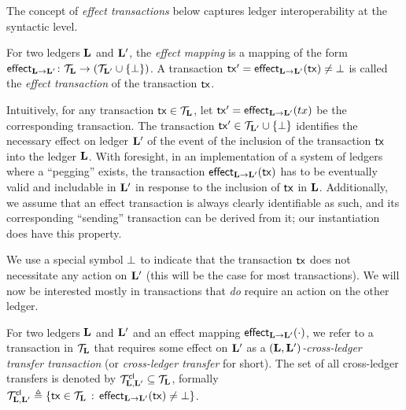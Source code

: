 The concept of {\em effect transactions} below captures ledger interoperability
at the syntactic level.

\begin{definition}
\label{def:effect}
For two ledgers $\mathbf{L}$ and $\mathbf{L}'$, the \emph{effect mapping} is a
mapping of the form
$
  \mathsf{effect}_{\mathbf{L}\rightarrow \mathbf{L}'}
\colon
\mathcal{T}_{\mathbf{L}}
\to
\left(
  \mathcal{T}_{\mathbf{L}'}
  \cup
  \{\bot\}
\right)
$.
  A transaction $ \mathsf{tx}'=\mathsf{effect}_{\mathbf{L}\rightarrow \mathbf{L}'}(\mathsf{tx}) \neq \bot$ is called the \emph{effect
transaction} of the transaction $\mathsf{tx}$.
\end{definition}

Intuitively, for any transaction $\mathsf{tx}\in\mathcal{T}_{\mathbf{L}}$, let $\mathsf{tx}' = \mathsf{effect}_{\mathbf{L}\rightarrow \mathbf{L}'}(tx)$ be the corresponding transaction. The transaction $\mathsf{tx}' \in \mathcal{T}_{\mathbf{L}'}\cup\{\bot\}$ identifies
the necessary effect on ledger $\mathbf{L}'$ of the  event of the inclusion of the transaction $\mathsf{tx}$ into the ledger
$\mathbf{L}$. With foresight, in an implementation of a  system of ledgers where a ``pegging''   exists, the transaction
$\mathsf{effect}_{\mathbf{L}\rightarrow \mathbf{L}'}(\mathsf{tx})$ has to be eventually valid and includable in
$\mathbf{L}'$ in response to the inclusion of $\mathsf{tx}$ in $\mathbf{L}$.
Additionally, we assume that an effect transaction is
always clearly identifiable as such, and its corresponding ``sending''
transaction can be derived from it; our instantiation does have this property.


We use a special symbol $\bot$ to indicate that the transaction $\mathsf{tx}$ does
not necessitate any action on $\mathbf{L}'$ (this will be the case for most
transactions).
We will now be interested mostly in transactions that \emph{do}
require an action on the other ledger.

\begin{definition}
For two ledgers $\mathbf{L}$ and $\mathbf{L}'$ and an effect mapping
$\mathsf{effect}_{\mathbf{L}\rightarrow \mathbf{L}'}(\cdot)$, we refer to a transaction in
$\mathcal{T}_{\mathbf{L}}$ that requires some effect on $\mathbf{L}'$ as
a \emph{$(\mathbf{L},\mathbf{L}')$-cross-ledger transfer
transaction} (or \emph{cross-ledger transfer} for short).
The set of all cross-ledger transfers is denoted by
  $\mathcal{T}_{\mathbf{L},\mathbf{L}'}^{\mathsf{cl}}\subseteq\mathcal{T}_{\mathbf{L}}$,
formally
$
  \mathcal{T}_{\mathbf{L},\mathbf{L}'}^{\mathsf{cl}}
\triangleq
\left\{ \mathsf{tx} \in \mathcal{T}_{\mathbf{L}} \,:\, \mathsf{effect}_{\mathbf{L}\rightarrow \mathbf{L}'}(\mathsf{tx})\neq\bot \right\}
$.
\end{definition}

